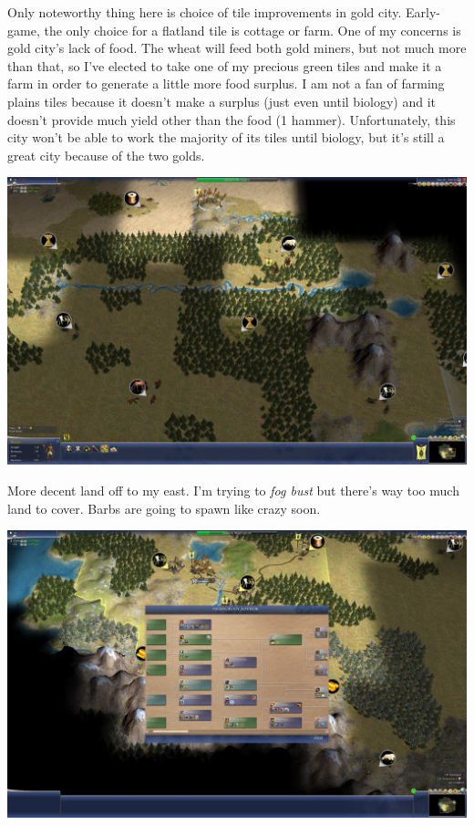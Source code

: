\documentclass[10pt]{article}
\begin{document}
Only noteworthy thing here is choice of tile improvements in gold city. Early-game, the only choice
for a flatland tile is cottage or farm. One of my concerns is gold city's lack of food. The wheat will
feed both gold miners, but not much more than that, so I've elected to take one of my precious green
tiles and make it a farm in order to generate a little more food surplus. I am not a fan of farming
plains tiles because it doesn't make a surplus (just even until biology) and it doesn't provide much
yield other than the food (1 hammer). Unfortunately, this city won't be able to work the majority of its
tiles until biology, but it's still a great city because of the two golds.

\includegraphics[width=1.0\textwidth]{22}

More decent land off to my east. I'm trying to \emph{fog bust} but there's way too much land to cover.
Barbs are going to spawn like crazy soon.

\includegraphics[width=1.0\textwidth]{23}
\end{document}
